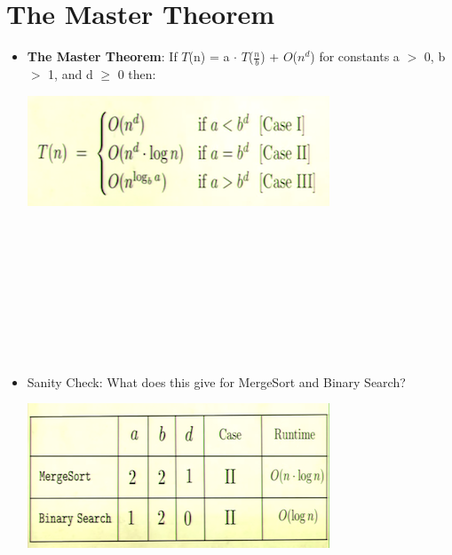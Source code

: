 \documentclass[12pt]{article}
\begin{document}
\section{The Master Theorem}
\renewcommand{\labelitemii}{$\circ$}
\renewcommand{\labelitemiii}{$\cdot$}
\renewcommand{\labelitemiii}{$\rightarrow$}
\begin{itemize}
\item \textbf{The Master Theorem}: If $T$(n) = a $\cdot$ $T$($\frac{n}{b}$) + $O$($n^d$) for constants a $>$ 0, b $>$ 1, and d $\geq$ 0 then:
\begin{center}
\includegraphics{lecture3a}
\end{center}
\noindent \\
\noindent \\
\noindent \\
\noindent \\
\noindent \\
\noindent \\
\noindent \\
\noindent \\
\item Sanity Check: What does this give for MergeSort and Binary Search?
\begin{center}
\includegraphics{lecture3b}
\end{center}
\end{itemize}
\end{document}
